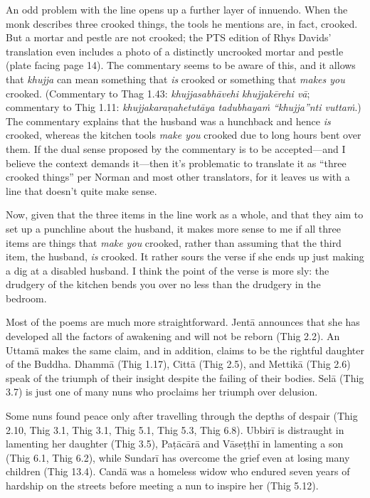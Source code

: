 \documentclass[12pt,openany]{book}%
\begin{document}
An odd problem with the line opens up a further layer of innuendo. When the monk describes three crooked things, the tools he mentions are, in fact, crooked. But a mortar and pestle are not crooked; the PTS edition of Rhys Davids’ translation even includes a photo of a distinctly uncrooked mortar and pestle (plate facing page 14). The commentary seems to be aware of this, and it allows that \textit{khujja} can mean something that \emph{is} crooked or something that \emph{makes you} crooked. (Commentary to Thag 1.43: \textit{\textsanskrit{khujjasabhāvehi} khujjakērehi \textsanskrit{vā}}; commentary to Thig 1.11: \textit{\textsanskrit{khujjakaraṇahetutāya} \textsanskrit{tadubhayaṁ} “khujja”nti \textsanskrit{vuttaṁ}}.) The commentary explains that the husband was a hunchback and hence \emph{is} crooked, whereas the kitchen tools \emph{make you} crooked due to long hours bent over them. If the dual sense proposed by the commentary is to be accepted—and I believe the context demands it—then it’s problematic to translate it as “three crooked things” per Norman and most other translators, for it leaves us with a line that doesn’t quite make sense.

Now, given that the three items in the line work as a whole, and that they aim to set up a punchline about the husband, it makes more sense to me if all three items are things that \emph{make you} crooked, rather than assuming that the third item, the husband, \emph{is} crooked. It rather sours the verse if she ends up just making a dig at a disabled husband. I think the point of the verse is more sly: the drudgery of the kitchen bends you over no less than the drudgery in the bedroom.

Most of the poems are much more straightforward. \textsanskrit{Jentā} announces that she has developed all the factors of awakening and will not be reborn (Thig 2.2). An \textsanskrit{Uttamā} makes the same claim, and in addition, claims to be the rightful daughter of the Buddha. \textsanskrit{Dhammā} (Thig 1.17), \textsanskrit{Cittā} (Thig 2.5), and \textsanskrit{Mettikā} (Thig 2.6) speak of the triumph of their insight despite the failing of their bodies. \textsanskrit{Selā} (Thig 3.7) is just one of many nuns who proclaims her triumph over delusion.

Some nuns found peace only after travelling through the depths of despair (Thig 2.10, Thig 3.1, Thig 3.1, Thig 5.1, Thig 5.3, Thig 6.8). \textsanskrit{Ubbirī} is distraught in lamenting her daughter (Thig 3.5), \textsanskrit{Paṭācārā} and \textsanskrit{Vāseṭṭhī} in lamenting a son (Thig 6.1, Thig 6.2), while \textsanskrit{Sundarī} has overcome the grief even at losing many children (Thig 13.4). \textsanskrit{Candā} was a homeless widow who endured seven years of hardship on the streets before meeting a nun to inspire her (Thig 5.12).
\end{document}
